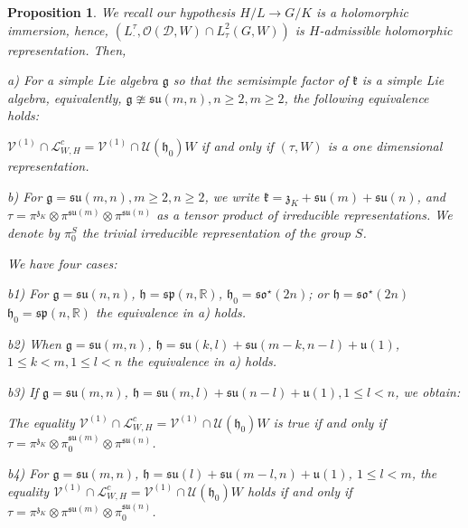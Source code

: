 \documentclass[12pt]{amsart}
\newtheorem{prop}[thm]{Proposition}
\theoremstyle{definition}
\theoremstyle{remark}
\newcommand{\g}{\mathfrak{g}}
\newcommand{\h}{\mathfrak{h}}
\renewcommand{\k}{{\mathfrak k}}
\newcommand{\R}{{\mathbb R}}
\numberwithin{equation}{section}
\begin{document}
  \begin{prop}\label{sub:7} We recall  our hypothesis   $H/L \rightarrow G/K$ is a holomorphic immersion, hence,  $(L_\cdot^\tau ,\mathcal O(\mathcal D,W)\cap L_\tau^2(G,W))$ is $H$-admissible holomorphic representation. Then,

  a) For a simple Lie algebra $\g$ so that the semisimple factor of $\k$ is a simple Lie algebra, equivalently,  $\g\ncong \mathfrak{su}(m,n) , n\geq 2, m\geq 2$,  the following equivalence holds:

\medskip

  $  \mathcal V^{(1)}\cap \mathcal L_{W,H}^c  =  \mathcal V^{(1)}\cap \mathcal U(\h_0)W  $ if and only if $(\tau,W)$ is a one dimensional representation.

\smallskip

 b) For $\g= \mathfrak{su}(m,n),  m\geq 2, n\geq 2 $, we write $\k=\mathfrak z_K +\mathfrak{su}(m)+\mathfrak{su}(n)$, and $\tau =\pi^{\mathfrak z_K} \otimes \pi^{\mathfrak{su}(m) } \otimes \pi^{\mathfrak{su}(n)}$  as a tensor product of irreducible representations. We denote by $\pi_0^S$  the trivial irreducible representation of the group $S$.

We have four cases:

 b1) For $\g= \mathfrak{su}(n,n)$, $\h=\mathfrak{sp}(n,\R)$, $\h_0=\mathfrak{so}^\star (2n) $; or $\h=\mathfrak{so}^\star (2n) $ $\h_0=\mathfrak{sp}(n,\R)$ the equivalence in a) holds.


 b2) When $\g= \mathfrak{su}(m,n)$, $\h=\mathfrak{su}(k,l)+\mathfrak{su}(m-k,n-l)+\mathfrak u(1)$, $1\leq k <m, 1\leq l <n$ the equivalence in a) holds.

b3) If $\g= \mathfrak{su}(m,n)$, $\h=\mathfrak{su}(m,l)+\mathfrak{su}(n-l)+\mathfrak u(1),  1\leq l <n$, we obtain:

 The equality $  \mathcal V^{(1)}\cap \mathcal L_{W,H}^c  =  \mathcal V^{(1)}\cap \mathcal U(\h_0)W  $ is true if and only if $\tau = \pi^{\mathfrak z_K} \otimes \pi_0^{\mathfrak{su}(m) } \otimes \pi^{\mathfrak{su}(n)}$.

 b4)  For $\g= \mathfrak{su}(m,n)$, $\h=\mathfrak{su}(l)+ \mathfrak{su}(m-l,n)+ \mathfrak u(1)$, $1\leq l <m$, the equality  $  \mathcal V^{(1)}\cap \mathcal L_{W,H}^c  =  \mathcal V^{(1)}\cap \mathcal U(\h_0)W  $ holds if and only if $\tau= \pi^{\mathfrak z_K} \otimes \pi^{\mathfrak{su}(m) } \otimes \pi_0^{\mathfrak{su}(n)}$.



\end{prop}
\end{document}
